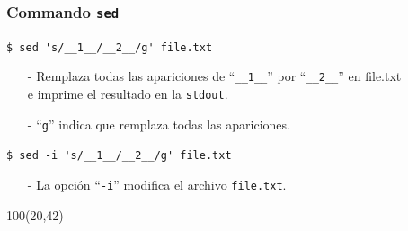 \documentclass{beamer}
\begin{document}
\begin{frame}[fragile,t]
    \frametitle{Commando \texttt{sed}}
    \begin{block}{\vspace*{-3ex}}
    \texttt{\$}\verb: sed 's/__1__/__2__/g' file.txt:
    \vspace*{0.5ex}
    \end{block}
    \begin{itemize}
    \item[-] Remplaza todas las apariciones de ``\verb|__1__|'' por ``\verb|__2__|'' en file.txt\\ e imprime el resultado en la \texttt{stdout}.
    \item[-] ``\verb|g|'' indica que remplaza todas las apariciones.
    \end{itemize}
    \vspace{2cm}
    \pause
    \begin{block}{\vspace*{-3ex}}
    \texttt{\$}\verb: sed -i 's/__1__/__2__/g' file.txt:
    \vspace*{0.5ex}
    \end{block}
    \begin{itemize}
    \item[-] La opci\'on ``\verb|-i|'' modifica el archivo \verb|file.txt|.
    \end{itemize}
    \begin{textblock}{100}(20,42)
    \begin{center}
    \end{center}
    \end{textblock}
\end{frame}
\end{document}
